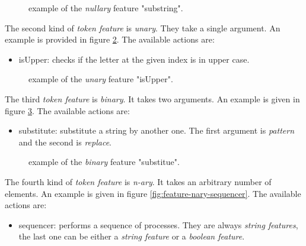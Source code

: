 \documentclass[manual-fr.tex]{subfiles}
\begin{document}
\begin{figure}[ht!]
\footnotesize
\begin{xml}
\end{xml}
\caption{example of the \textit{nullary} feature "substring".}
\label{fig:feature-nullary-substring}
\end{figure}

The second kind of \emph{token feature} is \emph{unary}. They take a single argument. An example is provided in figure \ref{fig:feature-unary-isUpper}. The available actions are:
\begin{itemize}
    \item isUpper: checks if the letter at the given index is in upper case.
\end{itemize}

\begin{figure}[ht!]
\footnotesize
\begin{xml}
\end{xml}
\caption{example of the \textit{unary} feature "isUpper".}
\label{fig:feature-unary-isUpper}
\end{figure}

The third \textit{token feature} is \textit{binary}. It takes two arguments. An example is given in figure \ref{fig:feature-binary-substitute}. The available actions are:
\begin{itemize}
    \item substitute: substitute a string by another one. The first argument is \textit{pattern} and the second is \textit{replace}.
\end{itemize}

\begin{figure}[ht!]
\footnotesize
\begin{xml}
\end{xml}
\caption{example of the \textit{binary} feature "substitue".}
\label{fig:feature-binary-substitute}
\end{figure}

The fourth kind of \textit{token feature} is \textit{n-ary}. It takes an arbitrary number of elements. An example is given in figure \ref{fig:feature-nary-sequencer}. The available actions are:
\begin{itemize}
    \item sequencer: performs a sequence of processes. They are always \textit{string features}, the last one can be either a \textit{string feature} or a \textit{boolean feature}.
\end{itemize}
\end{document}
